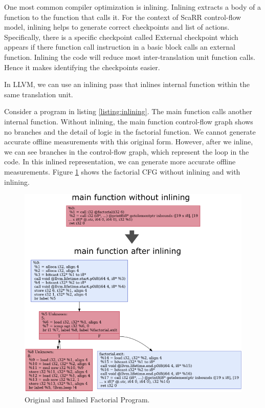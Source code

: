 One most common compiler optimization is inlining. Inlining extracts a body of a
function to the function that calls it. For the context of ScaRR control-flow
model, inlining helps to generate correct checkpoints and list of actions.
Specifically, there is a specific checkpoint called External checkpoint which
appears if there function call instruction in a basic block calls an external
function. Inlining the code will reduce most inter-translation unit function
calls. Hence it makes identifying the checkpoints easier.

In LLVM, we can use an inlining pass that inlines internal function within the same
translation unit.

Consider a program in listing \ref{listing:inlining}. The main function calls
another internal function. Without inlining, the main function control-flow
graph shows no branches and the detail of logic in the factorial function. We
cannot generate accurate offline measurements with this original form. However,
after we inline, we can see branches in the control-flow graph, which represent
the loop in the code. In this inlined representation, we can generate more
accurate offline measurements. Figure \ref{fig:inlining} shows the factorial CFG
without inlining and with inlining.


\begin{figure}[h]
    \centerline{\includegraphics[scale=.80]{Figures/04/inlining-function.png}}
    \caption{Original and Inlined Factorial Program.}
    \label{fig:inlining}
\end{figure}

